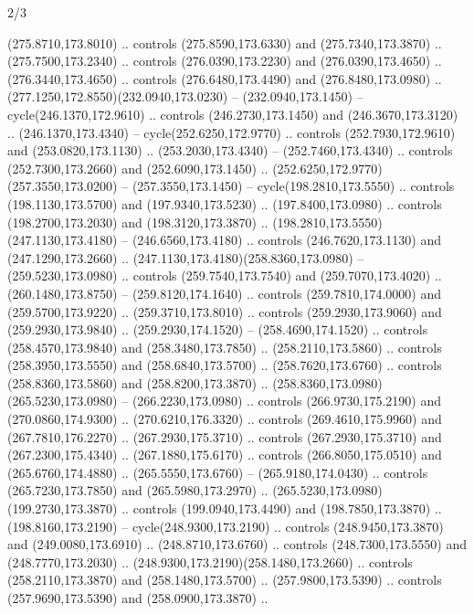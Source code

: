 \begin{flagdescription}{2/3}
\begin{scope}[xshift=0.5\flaglength,yshift=0.5\flagwidth,scale=\flagwidth/259.2]
\begin{scope}[y=0.8pt, x=0.8pt, yscale=-1,shift={(-243,-162)}]
      (275.8710,173.8010) .. controls (275.8590,173.6330) and (275.7340,173.3870) ..
      (275.7500,173.2340) .. controls (276.0390,173.2230) and (276.0390,173.4650) ..
      (276.3440,173.4650) .. controls (276.6480,173.4490) and (276.8480,173.0980) ..
      (277.1250,172.8550)(232.0940,173.0230) -- (232.0940,173.1450) --
      cycle(246.1370,172.9610) .. controls (246.2730,173.1450) and
      (246.3670,173.3120) .. (246.1370,173.4340) -- cycle(252.6250,172.9770) ..
      controls (252.7930,172.9610) and (253.0820,173.1130) .. (253.2030,173.4340) --
      (252.7460,173.4340) .. controls (252.7300,173.2660) and (252.6090,173.1450) ..
      (252.6250,172.9770)(257.3550,173.0200) -- (257.3550,173.1450) --
      cycle(198.2810,173.5550) .. controls (198.1130,173.5700) and
      (197.9340,173.5230) .. (197.8400,173.0980) .. controls (198.2700,173.2030) and
      (198.3120,173.3870) .. (198.2810,173.5550)(247.1130,173.4180) --
      (246.6560,173.4180) .. controls (246.7620,173.1130) and (247.1290,173.2660) ..
      (247.1130,173.4180)(258.8360,173.0980) -- (259.5230,173.0980) .. controls
      (259.7540,173.7540) and (259.7070,173.4020) .. (260.1480,173.8750) --
      (259.8120,174.1640) .. controls (259.7810,174.0000) and (259.5700,173.9220) ..
      (259.3710,173.8010) .. controls (259.2930,173.9060) and (259.2930,173.9840) ..
      (259.2930,174.1520) -- (258.4690,174.1520) .. controls (258.4570,173.9840) and
      (258.3480,173.7850) .. (258.2110,173.5860) .. controls (258.3950,173.5550) and
      (258.6840,173.5700) .. (258.7620,173.6760) .. controls (258.8360,173.5860) and
      (258.8200,173.3870) .. (258.8360,173.0980)(265.5230,173.0980) --
      (266.2230,173.0980) .. controls (266.9730,175.2190) and (270.0860,174.9300) ..
      (270.6210,176.3320) .. controls (269.4610,175.9960) and (267.7810,176.2270) ..
      (267.2930,175.3710) .. controls (267.2930,175.3710) and (267.2300,175.4340) ..
      (267.1880,175.6170) .. controls (266.8050,175.0510) and (265.6760,174.4880) ..
      (265.5550,173.6760) -- (265.9180,174.0430) .. controls (265.7230,173.7850) and
      (265.5980,173.2970) .. (265.5230,173.0980)(199.2730,173.3870) .. controls
      (199.0940,173.4490) and (198.7850,173.3870) .. (198.8160,173.2190) --
      cycle(248.9300,173.2190) .. controls (248.9450,173.3870) and
      (249.0080,173.6910) .. (248.8710,173.6760) .. controls (248.7300,173.5550) and
      (248.7770,173.2030) .. (248.9300,173.2190)(258.1480,173.2660) .. controls
      (258.2110,173.3870) and (258.1480,173.5700) .. (257.9800,173.5390) .. controls
      (257.9690,173.5390) and (258.0900,173.3870) ..

\end{scope}
\end{scope}
\end{flagdescription}
